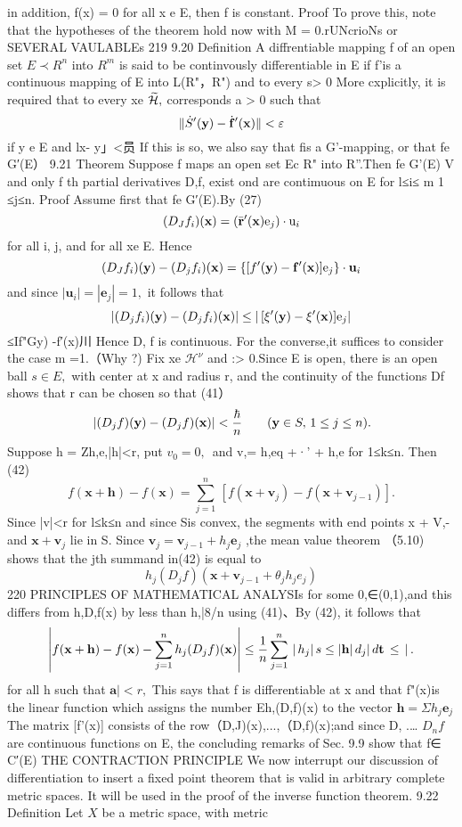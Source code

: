 in addition, f(x) = 0 for all x e E, then f is constant. Proof To prove this, note that the hypotheses of the theorem hold now with M = 0.rUNcrioNs or SEVERAL VAULABLEs 219 9.20 Definition A diffrentiable mapping f of an open set $E\prec R^{n}$ into $R^{m}$ is said to be continvously differentiable in E if f’is a continuous mapping of E into L(R"，R") and to every s> 0 More cxplicitly, it is required that to every xe ${\widetilde{\cal H}},$ corresponds a > 0 such that $$ \|{\dot{S}}^{\prime}({\bf y})-{\dot{\bf f}}^{\prime}({\bf x})\|<\varepsilon $$ if y e E and lx- y」<员 If this is so, we also say that fis a G'-mapping, or that fe G′(E） 9.21 Theorem Suppose f maps an open set Ec R" into R”.Then fe G'(E) V and only f th partial derivatives D,f, exist ond are contimuous on E for l≤i≤ m 1 ≤j≤n. Proof Assume first that fe G′(E).By (27) $$ (D_{J}f_{i})({\bf x})=(\bar{\bf r}^{\prime}({\bf x})\mathrm{e}_{j})\cdot\mathrm{u}_{i} $$ for all i, j, and for all xe E. Hence $$ (D_{J}f_{i})({\bf y})-(D_{j}f_{i})({\bf x})=\{[f^{\prime}({\bf y})-{\bf f^{\prime}}({\bf x})]\mathrm{e}_{j}\}\cdot\mathbf{u}_{i} $$ and since $|\mathbf{u}_{i}|=|\mathbf{e}_{j}|=1,$ it follows that $$ |(D_{j}f_{i})({\bf y})-(D_{j}f_{i})({\bf x})|\leq\left|\,[\xi^{\prime}({\bf y})-\xi^{\prime}({\bf x})]\mathrm{e}_{j}\right| $$ ≤If"Gy) -f′(x)川 Hence D, f is continuous. For the converse,it suffices to consider the case m =1.（Why ?) Fix xe ${\mathcal{H}}^{\nu}$ and :> 0.Since E is open, there is an open ball $\textstyle s\in E,$ with center at x and radius r, and the continuity of the functions Df shows that r can be chosen so that (41） $$ \left. |(D_{j}f)({\bf y})-(D_{j}f)({\bf x})\right|<\frac{\hbar}{n}\quad\quad({\bf y}\in S,\,1\leq j\leq n). $$ Suppose h = Zh,e,|h|<r, put $v_{0}=0,\,$ and v,= h,eq +·' + h,e for 1≤k≤n. Then (42) $$ f(\mathbf{x}+\mathbf{h})-f(\mathbf{x})=\sum_{j=1}^{n}\,[f(\mathbf{x}+\mathbf{v}_{j})-f(\mathbf{x}+\mathbf{v}_{j-1})]. $$ Since |v|<r for l≤k≤n and since Sis convex, the segments with end points x + V,- and $\mathbf{x}+\mathbf{v}_{j}$ lie in S. Since $\mathbf{v}_{j}=\mathbf{v}_{j-1}+h_{j}\mathbf{e}_{j}$ ,the mean value theorem （5.10) shows that the jth summand in(42) is equal to $$ h_{j}(D_{j}f)(\mathbf{x}+\mathbf{v}_{j-1}+\theta_{j}h_{j}e_{j}) $$220 PRINCIPLES OF MATHEMATICAL ANALYSIs for some 0,∈(0,1),and this differs from h,D,f(x) by less than h,|8/n using (41)、By (42), it follows that $$ \left|f({\bf x}+{\bf h})-f({\bf x})-\sum_{j=1}^{n}h_{j}(D_{j}f)({\bf x})\right|\leq\frac{1}{n}\sum_{j=1}^{n}\,\vert\,h_{j}\vert\,s\leq\vert{\bf h}\vert\,d_{j}\vert\,d{\bf t}\,\leq\,\vert\,. $$ for all h such that $\mathbf{a}|<r,$ This says that f is differentiable at x and that f"(x)is the linear function which assigns the number Eh,(D,f)(x) to the vector $\mathbf{h}=\Sigma h_{j}\mathbf{e}_{j}$ The matrix [f'(x)] consists of the row（D,J)(x),...,（D,f)(x);and since D, .… $D_{n}f$ are continuous functions on E, the concluding remarks of Sec. 9.9 show that f∈ C′(E) THE CONTRACTION PRINCIPLE We now interrupt our discussion of differentiation to insert a fixed point theorem that is valid in arbitrary complete metric spaces. It will be used in the proof of the inverse function theorem. 9.22 Definition Let $\textstyle X$ be a metric space, with metric 